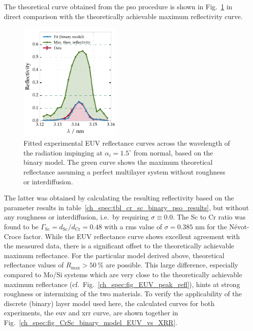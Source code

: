 The theoretical curve obtained from the \gls{pso} procedure is shown in Fig.~\ref{ch_spec:fig_CrSc_binary_fit_vs_max_refl} in direct comparison with the theoretically achievable maximum reflectivity curve.
\begin{figure}[htbp]
  \centering
  \includegraphics[width=0.45\textwidth]{img/CrSc_binary_fit_vs_max_refl}
  \caption{Fitted experimental EUV reflectance curves across the wavelength 
of the radiation impinging at $\alpha_i=1.5^\circ$ from normal, based on the binary 
model. The green curve shows the maximum theoretical reflectance assuming a perfect multilayer system without roughness or interdiffusion.}
  \label{ch_spec:fig_CrSc_binary_fit_vs_max_refl}
\end{figure}
The latter was obtained by calculating the resulting reflectivity based on the parameter results in table~\ref{ch_spec:tbl_cr_sc_binary_pso_results}, but without any roughness or interdiffusion, i.e.~by requiring $\sigma \equiv 0.0$. The Sc 
to Cr ratio was found to be $\Gamma_\text{Sc}= d_\text{Sc}/d_\text{Cr} = 0.48$ with a \gls{rms} value of $\sigma=0.385$ nm for the N\'{e}vot-Croce factor. While the EUV reflectance curve shows excellent agreement with the measured data, there is a significant offset to the theoretically achievable maximum reflectance. For the particular model derived above, theoretical reflectance values of $R_\text{max} > \SI{50}{\percent}$ are possible. This large difference, especially compared to Mo/Si systems which are very close to the theoretically achievable maximum reflectance (cf.~Fig.~\ref{ch_spec:fig_EUV_peak_refl}), hints at strong roughness or intermixing of the two materials. To verify the applicability of the discrete (binary) layer model used here, the calculated curves for both experiments, the \gls{euv} and \gls{xrr} curve, are shown together in Fig.~\ref{ch_spec:fig_CrSc_binary_model_EUV_vs_XRR}.
